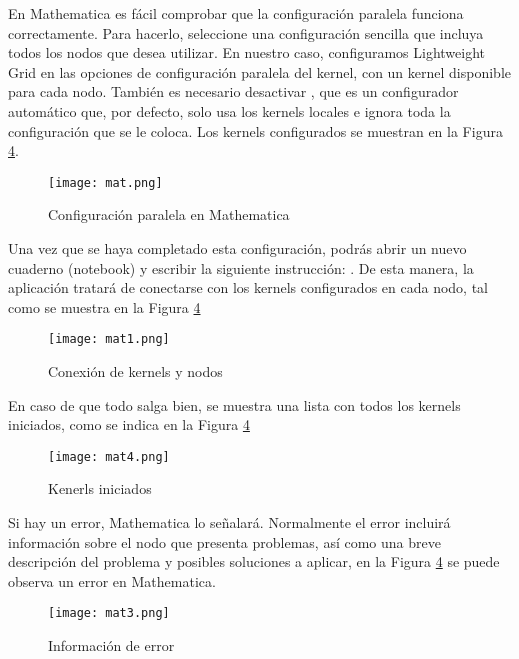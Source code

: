 \begin{spacing}{1.5}
En Mathematica es fácil comprobar que la configuración paralela funciona correctamente. Para hacerlo, seleccione una configuración sencilla que incluya todos los nodos que desea utilizar. En nuestro caso, configuramos Lightweight Grid en las opciones de configuración paralela del kernel, con un kernel disponible para cada nodo. También es necesario desactivar , que es un configurador automático que, por defecto, solo usa los kernels locales e ignora toda la configuración que se le coloca. Los kernels configurados se muestran en la Figura \ref{fig:etiqueta}.  \newline  \newline

\begin{figure}[h]
    \centering
    \texttt{[image: mat.png]}
    \caption{Configuración paralela en Mathematica}
    \label{fig:etiqueta}
\end{figure}

Una vez que se haya completado esta configuración, podrás abrir un nuevo cuaderno (notebook) y escribir la siguiente instrucción: . De esta manera, la aplicación tratará de conectarse con los kernels configurados en cada nodo, tal como se muestra en la Figura \ref{fig:etiqueta}

\begin{figure}[h]
    \centering
    \texttt{[image: mat1.png]}
    \caption{Conexión de kernels y nodos}
    \label{fig:etiqueta}
\end{figure}

En caso de que todo salga bien, se muestra una lista con todos los kernels iniciados, como se indica en la Figura \ref{fig:etiqueta}

\begin{figure}[h]
    \centering
    \texttt{[image: mat4.png]}
    \caption{Kenerls iniciados}
    \label{fig:etiqueta}
\end{figure}

Si hay un error, Mathematica lo señalará. Normalmente el error incluirá información sobre el nodo que presenta problemas, así como una breve descripción del problema y posibles soluciones a aplicar, en la Figura \ref{fig:etiqueta} se puede observa un error en Mathematica.

\begin{figure}[h]
    \centering
    \texttt{[image: mat3.png]}
    \caption{Información de error}
    \label{fig:etiqueta}
\end{figure}


\end{spacing}
